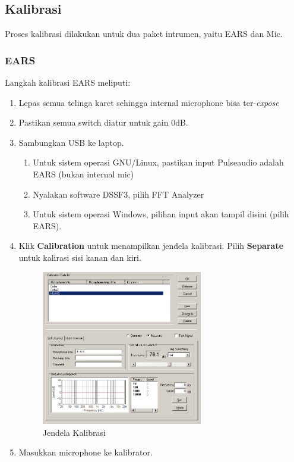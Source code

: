 \documentclass[12pt,]{article}
\begin{document}
	\subsection{Kalibrasi}
	
	Proses kalibrasi dilakukan untuk dua paket intrumen, yaitu EARS dan Mic.
	
	\subsubsection{EARS}
	
	Langkah kalibrasi EARS meliputi:
	\begin{enumerate}
		\item Lepas semua telinga karet sehingga internal microphone bisa ter-\textit{expose}
		\item Pastikan semua switch diatur untuk gain 0dB.
		\item Sambungkan USB ke laptop.
		\begin{enumerate}
			\item Untuk sistem operasi GNU/Linux, pastikan input Pulseaudio adalah EARS (bukan internal mic)
			\item Nyalakan software DSSF3, pilih FFT Analyzer
			\item Untuk sistem operasi Windows, pilihan input akan tampil disini (pilih EARS).	
	\end{enumerate}
		\item Klik \textbf{Calibration} untuk menampilkan jendela kalibrasi.
		Pilih \textbf{Separate} untuk kalirasi sisi kanan dan kiri.
		\begin{figure}[!ht]
			\centering
			\includegraphics[width=200pt]{images/kalib}
			\caption{Jendela Kalibrasi}
		\end{figure}
		\item Masukkan microphone ke kalibrator.
		\begin{figure}[!ht]

\end{figure}
\end{enumerate}
\end{document}
